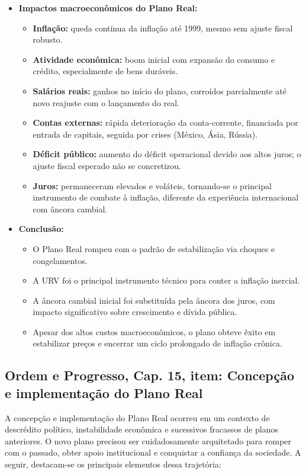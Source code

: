 \documentclass[a4paper,12pt]{article}[abntex2]
\begin{document}
\begin{itemize}
    \item \textbf{Impactos macroeconômicos do Plano Real:}
    \begin{itemize}
        \item \textbf{Inflação:} queda contínua da inflação até 1999, mesmo sem ajuste fiscal robusto.
        \item \textbf{Atividade econômica:} boom inicial com expansão do consumo e crédito, especialmente de bens duráveis.
        \item \textbf{Salários reais:} ganhos no início do plano, corroídos parcialmente até novo reajuste com o lançamento do real.
        \item \textbf{Contas externas:} rápida deterioração da conta-corrente, financiada por entrada de capitais, seguida por crises (México, Ásia, Rússia).
        \item \textbf{Déficit público:} aumento do déficit operacional devido aos altos juros; o ajuste fiscal esperado não se concretizou.
        \item \textbf{Juros:} permaneceram elevados e voláteis, tornando-se o principal instrumento de combate à inflação, diferente da experiência internacional com âncora cambial.
    \end{itemize}

    \item \textbf{Conclusão:}
    \begin{itemize}
        \item O Plano Real rompeu com o padrão de estabilização via choques e congelamentos.
        \item A URV foi o principal instrumento técnico para conter a inflação inercial.
        \item A âncora cambial inicial foi substituída pela âncora dos juros, com impacto significativo sobre crescimento e dívida pública.
        \item Apesar dos altos custos macroeconômicos, o plano obteve êxito em estabilizar preços e encerrar um ciclo prolongado de inflação crônica.
    \end{itemize}

\end{itemize}

\subsection{\textbf{Ordem e Progresso, Cap. 15, item: Concepção e implementação do Plano Real}}

A concepção e implementação do Plano Real ocorreu em um contexto de descrédito político, instabilidade econômica e sucessivos fracassos de planos anteriores. O novo plano precisou ser cuidadosamente arquitetado para romper com o passado, obter apoio institucional e conquistar a confiança da sociedade. A seguir, destacam-se os principais elementos dessa trajetória:
\end{document}
